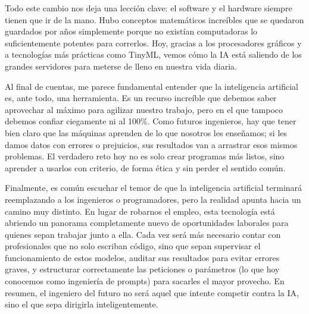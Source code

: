 \documentclass[12pt,letterpaper]{article}
\begin{document}
Todo este cambio nos deja una lección clave: el software y el hardware siempre tienen que ir de la mano. Hubo conceptos matemáticos increíbles que se quedaron guardados por años simplemente porque no existían computadoras lo suficientemente potentes para correrlos. Hoy, gracias a los procesadores gráficos y a tecnologías más prácticas como TinyML, vemos cómo la IA está saliendo de los grandes servidores para meterse de lleno en nuestra vida diaria.

Al final de cuentas, me parece fundamental entender que la inteligencia artificial es, ante todo, una herramienta. Es un recurso increíble que debemos saber aprovechar al máximo para agilizar nuestro trabajo, pero en el que tampoco debemos confiar ciegamente ni al 100\%. Como futuros ingenieros, hay que tener bien claro que las máquinas aprenden de lo que nosotros les enseñamos; si les damos datos con errores o prejuicios, sus resultados van a arrastrar esos mismos problemas. El verdadero reto hoy no es solo crear programas más listos, sino aprender a usarlos con criterio, de forma ética y sin perder el sentido común.

Finalmente, es común escuchar el temor de que la inteligencia artificial terminará reemplazando a los ingenieros o programadores, pero la realidad apunta hacia un camino muy distinto. En lugar de robarnos el empleo, esta tecnología está abriendo un panorama completamente nuevo de oportunidades laborales para quienes sepan trabajar junto a ella. Cada vez será más necesario contar con profesionales que no solo escriban código, sino que sepan supervisar el funcionamiento de estos modelos, auditar sus resultados para evitar errores graves, y estructurar correctamente las peticiones o parámetros (lo que hoy conocemos como ingeniería de prompts) para sacarles el mayor provecho. En resumen, el ingeniero del futuro no será aquel que intente competir contra la IA, sino el que sepa dirigirla inteligentemente.
\newpage


\end{document}
